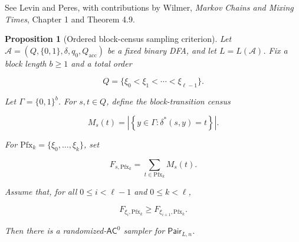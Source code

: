 \documentclass[10pt]{article}
\newtheorem{proposition}[theorem]{Proposition}
\theoremstyle{definition}
\newcommand{\AC}{\mathsf{AC}}
\newcommand{\Pair}{\mathsf{Pair}}
\newcommand{\bits}{\{0,1\}}
\begin{document}
See Levin and Peres, with contributions by Wilmer, \emph{Markov Chains and
Mixing Times}, Chapter 1 and Theorem 4.9.

\begin{proposition}[Ordered block-census sampling criterion]
\label{prop:ordered-block}
Let $\mathcal A=(Q,\bits,\delta,q_0,Q_{\mathrm{acc}})$ be a fixed binary DFA,
and let $L=L(\mathcal A)$.  Fix a block length $b\ge1$ and a total order

\begin{equation}
 Q=\{\xi_0<\xi_1<\cdots<\xi_{\ell-1}\}.
\end{equation}

Let $\Gamma=\bits^b$.  For $s,t\in Q$, define the block-transition census

\begin{equation}
 M_s(t)
 =
 \left|
  \left\{y\in\Gamma:\delta^*(s,y)=t\right\}
 \right|.
\end{equation}

For $\mathrm{Pfx}_k=\{\xi_0,\ldots,\xi_k\}$, set

\begin{equation}
 F_{s,\mathrm{Pfx}_k}
 =
 \sum_{t\in\mathrm{Pfx}_k}M_s(t).
\end{equation}

Assume that, for all $0\le i<\ell-1$ and $0\le k<\ell$,

\begin{equation}
 F_{\xi_i,\mathrm{Pfx}_k}
 \ge
 F_{\xi_{i+1},\mathrm{Pfx}_k}.
\end{equation}

Then there is a randomized-$\AC^0$ sampler for $\Pair_{L,n}$.
\end{proposition}
\end{document}
